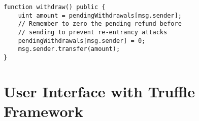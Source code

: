 \begin{lstlisting}[language=Solidity]
function withdraw() public {
    uint amount = pendingWithdrawals[msg.sender];
    // Remember to zero the pending refund before
    // sending to prevent re-entrancy attacks
    pendingWithdrawals[msg.sender] = 0;
    msg.sender.transfer(amount);
}
\end{lstlisting}

\newpage

\section{User Interface with Truffle Framework}\label{sec:truffle}


\chapterend

